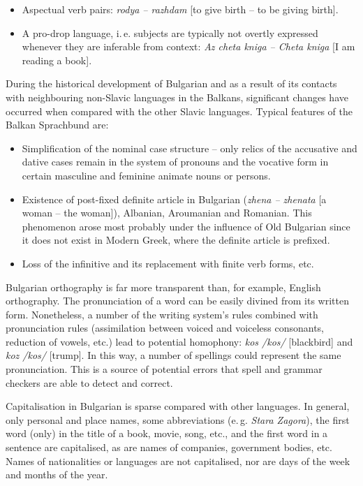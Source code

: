 \documentclass[]{../../metanetpaper}
\begin{document}
\begin{multicols}{2}
\begin{itemize}
\item Aspectual verb pairs: \textit{{rodya -- razhdam}} [to give birth – to be giving birth].

\item A pro-drop language, i.\,e. subjects are typically not overtly expressed whenever they are inferable from context: \textit{{Az cheta kniga -- Cheta kniga}} [I am reading a book]. 
\end{itemize}

During the historical development of Bulgarian and as a result of its contacts with neighbouring non-Slavic languages in the Balkans, significant changes have occurred when compared with the other Slavic languages. Typical features of the Balkan Sprachbund are:

\begin{itemize}
\item Simplification of the nominal case structure -- only relics of the accusative and dative cases remain in the system of pronouns and the vocative form in certain masculine and feminine animate nouns or persons.

\item Existence of post-fixed definite article in Bulgarian (\textit{{zhena -- zhenata}} [a woman -- the woman]), Albanian, Aroumanian and Romanian. This phenomenon arose most probably under the influence of Old Bulgarian since it does not exist in Modern Greek, where the definite article is prefixed.

\item Loss of the infinitive and its replacement with finite verb forms, etc. 
\end{itemize}

Bulgarian orthography is far more transparent than, for example, English orthography. The pronunciation of a word can be easily divined from its written form. Nonetheless, a number of the writing system's rules combined with pronunciation rules (assimilation between voiced and voiceless consonants, reduction of vowels, etc.) lead to potential homophony: \textit{{kos} /kos/} [blackbird] and \textit{{koz /kos/}} [trump]. In this way, a number of spellings could represent the same pronunciation. This is a source of potential errors that spell and grammar checkers are able to detect and correct.

Capitalisation in Bulgarian is sparse compared with other languages. In general, only personal and place names, some abbreviations (e.\,g. \textit{Stara Zagora}), the first word (only) in the title of a book, movie, song, etc., and the first word in a sentence are capitalised, as are names of companies, government bodies, etc. Names of nationalities or languages are not capitalised, nor are days of the week and months of the year.
 

\end{multicols}
\end{document}
